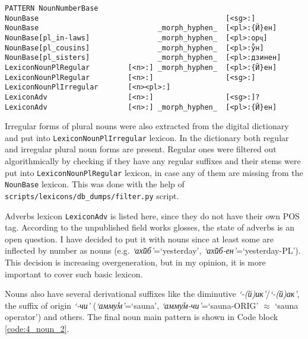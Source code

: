 \begin{code_frame}[float,floatplacement=!h]
    \begin{footnotesize}\codespacing
    \begin{verbatim}
PATTERN NounNumberBase
NounBase                                            [<sg>:]           
NounBase                            _morph_hyphen_  [<pl>:{Й}ен]        
NounBase[pl_in-laws]                _morph_hyphen_  [<pl>:орҷ]    
NounBase[pl_cousins]                _morph_hyphen_  [<pl>:у̊н]
NounBase[pl_sisters]                _morph_hyphen_  [<pl>:дзинен]  
LexiconNounPlRegular         [<n>:] _morph_hyphen_  [<pl>:{Й}ен]        
LexiconNounPlRegular         [<n>:]                 [<sg>:]   
LexiconNounPlIrregular       [<n><pl>:]
LexiconAdv                   [<n>:]                 [<sg>:]?
LexiconAdv                   [<n>:] _morph_hyphen_  [<pl>:{Й}ен]    
    \end{verbatim}
    \end{footnotesize}
    \tcblower
    \label{code:4_noun_1}
\end{code_frame}

Irregular forms of plural nouns were also extracted from the digital dictionary \parencite{makarov_digital_2022} and put into \texttt{LexiconNounPlIrregular} lexicon. In the dictionary both regular and irregular plural noun forms are present. Regular ones were filtered out algorithmically by checking if they have any regular suffixes and their stems were put into \texttt{LexiconNounPlRegular} lexicon, in case any of them are missing from the \texttt{NounBase} lexicon. This was done with the help of \texttt{scripts/lexicons/}\texttt{db\_dumps/filter.py} script.

Adverbs lexicon \texttt{LexiconAdv} is listed here, since they do not have their own POS tag. According to the unpublished field works glosses, the state of adverbs is an open question. I have decided to put it with nouns since at least some are inflected by number as nouns (e.g. \textit{`ах̌ӣб'}=`yesterday', \textit{`ах̌ӣб-ен'}=`yesterday-PL')\parencite{karamshoev_dialect_1963}. This decision is increasing overgeneration, but in my opinion, it is more important to cover such basic lexicon.

Nouns also have several derivational suffixes like the diminutive \textit{`-(й)ик'}/\textit{`-(й)ак'}, the suffix of origin \textit{`-чи'} (\textit{`амму̊м'}=`sauna', \textit{`амму̊м-чи'}=`sauna-ORIG' $\approx$ `sauna operator') and others. The final noun main pattern is shown in Code block \ref{code:4_noun_2}.

